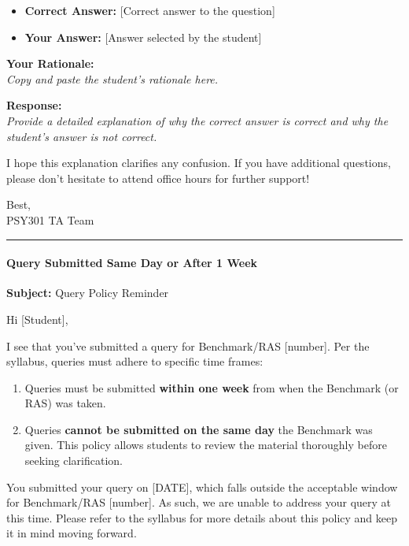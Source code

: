 \documentclass[
]{article}
\providecommand{\tightlist}{%
  \setlength{\itemsep}{0pt}\setlength{\parskip}{0pt}}
\begin{document}
\begin{itemize}
\tightlist
\item
  \textbf{Correct Answer:} {[}Correct answer to the question{]}\\
\item
  \textbf{Your Answer:} {[}Answer selected by the student{]}
\end{itemize}

\textbf{Your Rationale:}\\
\emph{Copy and paste the student's rationale here.}

\textbf{Response:}\\
\emph{Provide a detailed explanation of why the correct answer is correct and why the student's answer is not correct.}

I hope this explanation clarifies any confusion. If you have additional questions, please don't hesitate to attend office hours for further support!

Best,\\
PSY301 TA Team

\begin{center}\rule{0.5\linewidth}{0.5pt}\end{center}

\hypertarget{query-submitted-same-day-or-after-1-week}{%
\paragraph{Query Submitted Same Day or After 1 Week}\label{query-submitted-same-day-or-after-1-week}}

\textbf{Subject:} Query Policy Reminder

Hi {[}Student{]},

I see that you've submitted a query for Benchmark/RAS {[}number{]}. Per the syllabus, queries must adhere to specific time frames:

\begin{enumerate}
\def\labelenumi{\arabic{enumi}.}
\tightlist
\item
  Queries must be submitted \textbf{within one week} from when the Benchmark (or RAS) was taken.\\
\item
  Queries \textbf{cannot be submitted on the same day} the Benchmark was given. This policy allows students to review the material thoroughly before seeking clarification.
\end{enumerate}

You submitted your query on {[}DATE{]}, which falls outside the acceptable window for Benchmark/RAS {[}number{]}. As such, we are unable to address your query at this time. Please refer to the syllabus for more details about this policy and keep it in mind moving forward.
\end{document}
